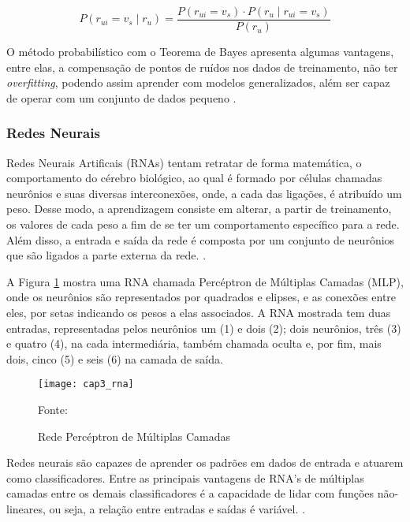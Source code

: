         \begin{equation}
              P(r_{ui} = v_s \mid r_u) = \frac{P(r_{ui}=v_s) \cdot P(r_u \mid r_{ui} = v_s)}{P(r_u)}
        \end{equation}
        
        O método probabilístico com o Teorema de Bayes apresenta algumas vantagens, entre elas, a compensação de pontos de ruídos nos dados de treinamento, não ter \textit{overfitting}, podendo assim aprender com modelos generalizados, além ser capaz de operar com um conjunto de dados pequeno \cite{Jannach2010}.
                
        \subsubsection{Redes Neurais}
        Redes Neurais Artificais (RNAs) tentam retratar de forma matemática, o comportamento do cérebro biológico, ao qual é formado por células chamadas neurônios e suas diversas interconexões, onde, a cada das ligações, é atribuído um peso. Desse modo, a aprendizagem consiste em alterar, a partir de treinamento, os valores de cada peso a fim de se ter um comportamento específico para a rede. Além disso, a entrada e saída da rede é composta por um conjunto de neurônios que são ligados a parte externa da rede. \cite{Russell2009}. 
        
        A Figura \ref{fig:cap3_rna} mostra uma RNA chamada Percéptron de Múltiplas Camadas (MLP), onde os neurônios são representados por quadrados e elipses, e as conexões entre eles, por setas indicando os pesos a elas associados. A RNA mostrada tem duas entradas, representadas pelos neurônios um (1) e dois (2); dois neurônios, três (3) e quatro (4), na cada intermediária, também chamada oculta e, por fim, mais dois, cinco (5) e seis (6) na camada de saída.
        
        \begin{figure}[htb]        
            \caption{Rede Percéptron de Múltiplas Camadas}
            \texttt{[image: cap3\_rna]}
            \label{fig:cap3_rna}
            
            \footnotesize{Fonte: }
        \end{figure}
        
        Redes neurais são capazes de aprender os padrões em dados de entrada e atuarem como classificadores. Entre as principais vantagens de RNA's de múltiplas camadas entre os demais classificadores é a capacidade de lidar com funções não-lineares, ou seja, a relação entre entradas e saídas é variável. \cite{Aggarwal2016}.
        
